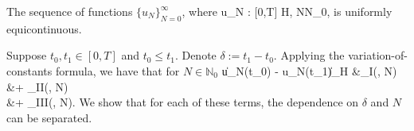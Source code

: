 \bt
The sequence of functions \(\{u_N\}_{N=0}^\infty\), where 
\be
    u_N : [0,T] \mapsto \mathcal H, \qquad N\in\mathbb N_0,
\ee 
is uniformly equicontinuous. 
\et

\bp
Suppose \(t_0,t_1\in [0,T]\) and \(t_0 \leq t_1\). Denote \(\delta := t_1 - t_0\). Applying the variation-of-constants formula, we have that for \(N\in\mathbb N_0\)
\bea
    \|u_N(t_0) - u_N(t_1)\|_{\mathcal H} &\leq {}_{\RN1(\delta, N)}  \\
    &+ _{\RN2(\delta, N)} \\
    &+ _{\RN3(\delta, N)}.
\eea
We show that for each of these terms, the dependence on \(\delta\) and \(N\) can be separated. %

